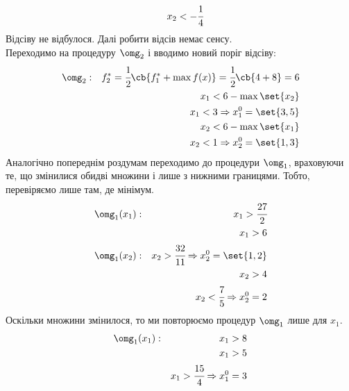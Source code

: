 \begin{tsk}
\begin{eqnarray}
&& x_2 < -\cfrac14 
\end{eqnarray}
Відсіву не відбулося. Далі робити відсів немає сенсу. \\
Переходимо на процедуру $\omg_2$ і вводимо новий поріг відсіву:
\begin{eqnarray}
&\omg_2:& f_2^\ast = \cfrac12\cb{f_1^\ast +\max f(x)}  = \cfrac12\cb{4+8} = 6\\
&& x_1 < 6 - \max\set{x_2} \\
&& x_1 < 3 \Rightarrow x_1^0 = \set{3,5}\\
&& x_2 < 6 - \max\set{x_1}\\
&& x_2 < 1 \Rightarrow x_2^0 = \set{1,3}
\end{eqnarray}
Аналогічно попереднім роздумам переходимо до процедури $\omg_1$, враховуючи те, що змінилися обидві множини і лише з нижними границями. Тобто, перевіряємо лише там, де мінімум.
\begin{eqnarray}
&\omg_1(x_1):& x_1 > \cfrac{27}2 \\
&& x_1 > 6 \\
&\omg_1(x_2):& x_2 > \cfrac{32}{11} \Rightarrow x_2^0 = \set{1,2}\\
&& x_2 > 4 \\
&& x_2 < \cfrac75 \Rightarrow x_2^0 = 2
\end{eqnarray}
Оскільки множини змінилося, то ми повторюємо процедур $\omg_1$ лише для $x_1$.
\begin{eqnarray}
&\omg_1(x_1):& x_1 > 8\\
&& x_1 > 5\\
&& x_1 > \cfrac{15}4  \Rightarrow x_1^0 = 3
\end{eqnarray}
\end{tsk}

